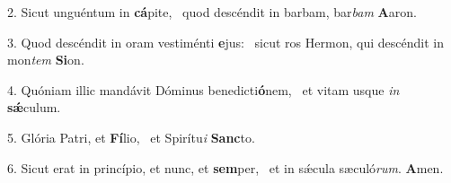 2. Sicut unguéntum in \textbf{cá}pite, \ast\  quod descéndit in barbam, bar\textit{bam} \textbf{A}aron.\

3. Quod descéndit in oram vestiménti \textbf{e}jus: \ast\  sicut ros Hermon, qui descéndit in mon\textit{tem} \textbf{Si}on.\

4. Quóniam illic mandávit Dóminus benedicti\textbf{ó}nem, \ast\  et vitam usque \textit{in} \textbf{sǽ}culum.\

5. Glória Patri, et \textbf{Fí}lio, \ast\  et Spirítu\textit{i} \textbf{Sanc}to.\

6. Sicut erat in princípio, et nunc, et \textbf{sem}per, \ast\  et in sǽcula sæculó\textit{rum}. \textbf{A}men.\

